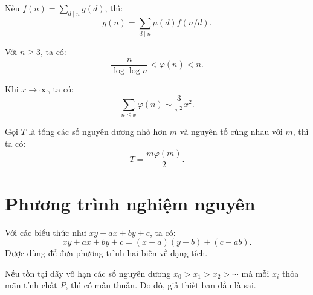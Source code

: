 \documentclass[../imo-training-open-book.tex]{subfiles}
\begin{document}
\begin{theorem}
    \label{theorem:mobius-inversion-arithmetic}
    Nếu \( f(n) = \sum_{d \mid n} g(d) \), thì:
    \[
        g(n) = \sum_{d \mid n} \mu(d) f(n/d).
    \]
\end{theorem}

\vspace{1em}

\begin{theorem}
    \label{theorem:totient-bound}
    Với \( n \ge 3 \), ta có:
    \[
        \frac{n}{\log \log n} < \varphi(n) < n.
    \]
\end{theorem}

\vspace{1em}

\begin{theorem}
    \label{theorem:totient-sum-asymptotic}
    Khi \( x \to \infty \), ta có:
    \[
        \sum_{n \le x} \varphi(n) \sim \frac{3}{\pi^2} x^2.
    \]
\end{theorem}

\begin{theorem*}
    \label{theorem:sum-coprime-m}
    Gọi \( T \) là tổng các số nguyên dương nhỏ hơn \( m \) và nguyên tố cùng nhau với \( m \), thì ta có:
    \[
        T = \frac{m\varphi(m)}{2}.
    \]
\end{theorem*}

\newpage

\section{Phương trình nghiệm nguyên}

\begin{theorem}
    \label{theorem:simon-trick}
    Với các biểu thức như \( xy + ax + by + c \), ta có:
    \[
        xy + ax + by + c = (x + a)(y + b) + (c - ab).
    \]
    Được dùng để đưa phương trình hai biến về dạng tích.
\end{theorem}

\vspace{1em}

\begin{lemma}
    \label{lemma:infinite-descent}
    Nếu tồn tại dãy vô hạn các số nguyên dương \( x_0 > x_1 > x_2 > \cdots \) mà mỗi \( x_i \) thỏa mãn tính chất \( P \), thì có mâu thuẫn. Do đó, giả thiết ban đầu là sai.
\end{lemma}
\end{document}
